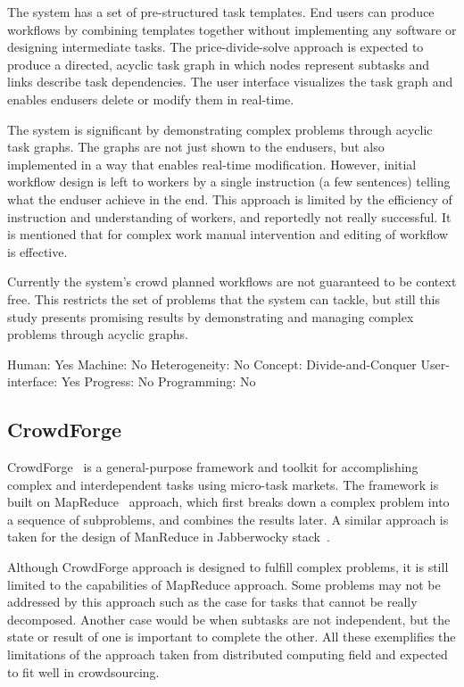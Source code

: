 The system has a set of pre-structured task templates. End users can produce 
workflows by combining templates together without implementing any software 
or designing intermediate tasks. The price-divide-solve approach is expected 
to produce a directed, acyclic task graph in which nodes represent subtasks and 
links describe task dependencies. The user interface visualizes the task graph 
and enables endusers delete or modify them in real-time.

The system is significant by demonstrating complex problems through acyclic 
task graphs. The graphs are not just shown to the endusers, but also implemented 
in a way that enables real-time modification. However, initial workflow design 
is left to workers by a single instruction (a few sentences) telling what the enduser 
achieve in the end. This approach is limited by the efficiency of instruction and 
understanding of workers, and reportedly not really successful. It is mentioned 
that for complex work manual intervention and editing of workflow is effective.

Currently the system's crowd planned workflows are not guaranteed to be 
context free. This restricts the set of problems that the system can tackle, 
but still this study presents promising results by demonstrating and managing 
complex problems through acyclic graphs.

Human: Yes
Machine: No
Heterogeneity: No
Concept: Divide-and-Conquer
User-interface: Yes
Progress: No
Programming: No

\subsection{CrowdForge}
CrowdForge~\cite{Kittur2011} is a general-purpose framework and toolkit for 
accomplishing complex and interdependent tasks using micro-task markets. 
The framework is built on MapReduce~\cite{Dean2008} approach, which first breaks 
down a complex problem into a sequence of subproblems, and combines the results 
later. A similar approach is taken for the design of ManReduce in Jabberwocky 
stack~\cite{Ahmad2011}.

Although CrowdForge approach is designed to fulfill complex problems, it is still limited 
to the capabilities of MapReduce approach. Some problems may not be addressed 
by this approach such as the case for tasks that cannot be really decomposed. 
Another case would be when subtasks are not independent, but the state 
or result of one is important to complete the other. All these exemplifies the 
limitations of the approach taken from distributed computing field and 
expected to fit well in crowdsourcing.

